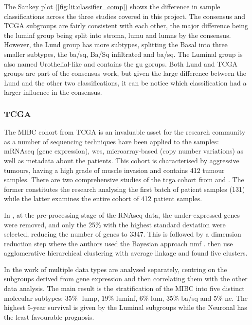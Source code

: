 The Sankey plot (\cref{fig:lit:classifier_comp}) shows the difference in sample classifications across the three studies covered in this project. The consensus and TCGA subgroups are fairly consistent with each other, the major difference being the \acrfull{luminf} group being split into \acrfull{stroma}, \acrfull{lumu} and \acrfull{lumns} by the consensus. However, the Lund group has more subtypes, splitting the Basal into three smaller subtypes, the \acrfull{ba/sq}, Ba/Sq infiltrated and \acrfull{ba/sq}. The Luminal group is also named Urothelial-like and contains the \acrfull{gu} gorups. Both Lund and TCGA groups are part of the consensus work, but given the large difference between the Lund and the other two classifications, it can be notice which classification had a larger influence in the consensus.


\subsubsection*{TCGA} \label{s:lit:tcga_mibc}

The MIBC cohort from TCGA is an invaluable asset for the research community as a number of sequencing techniques have been applied to the samples: mRNAseq (gene expression), \acrfull{wes}, microarray-based (copy number variations) as well as metadata about the patients. This cohort is characterised by aggressive tumours, having a high grade of muscle invasion and contains 412 tumour samples. There are two comprehensive studies of the \acrlong{tcga} cohort from \citet{Tcga2014-dr} and \citet{Robertson2017-mg}. The former constitutes the research analysing the first batch of patient samples (131) while the latter examines the entire cohort of 412 patient samples. 

In \citep{Robertson2017-mg}, at the pre-processing stage of the RNAseq data, the under-expressed genes were removed, and only the 25\% with the highest standard deviation were selected, reducing the number of genes to 3347. This is followed by a dimension reduction step where the authors used the Bayesian approach \acrfull{nmf} \citep{Schmidt2009-zh}. \citet{Robertson2017-mg} then use agglomerative hierarchical clustering with average linkage and found five clusters.

In the work of \citet{Robertson2017-mg} multiple data types are analysed separately, centring on the subgroups derived from gene expression and then correlating them with the other data analysis. The main result is the stratification of the MIBC into five distinct molecular subtypes: $35\%$- \acrfull{lump}, $19\%$ \acrfull{luminf}, $6\%$ \acrfull{lum}, $35\%$ \acrfull{ba/sq} and $5\%$ \acrfull{ne}. The highest 5-year survival is given by the Luminal subgroups while the Neuronal has the least favourable prognosis. 

